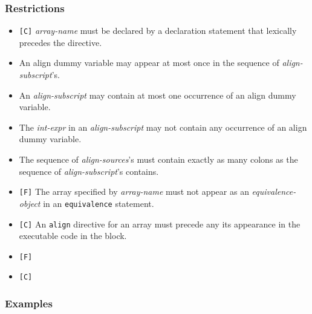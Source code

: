 
\subsubsection*{Restrictions}

\begin{itemize}
 \item \verb![C]! {\it array-name} must be declared by a declaration
       statement that lexically precedes the directive.
\item An align dummy variable may appear at most once in the sequence of
      {\it align-subscript}'s.
\item An {\it align-subscript} may contain at most one occurrence of an
      align dummy variable.
\item The {\it int-expr} in an {\it align-subscript} may not contain any
      occurrence of an align dummy variable.
\item The sequence of {\it align-sources}'s must contain exactly as many
      colons as the sequence of {\it align-subscript}'s contains.
\item \verb![F]! The array specified by {\it array-name} must not appear
      as an {\it equivalence-object} in an {\tt equivalence} statement.
\item \verb![C]! An {\tt align} directive for an array must
      precede any its appearance in the executable code in the block.
\item \verb![F]! 
\item \verb![C]! 
\end{itemize}

\subsubsection*{Examples}

